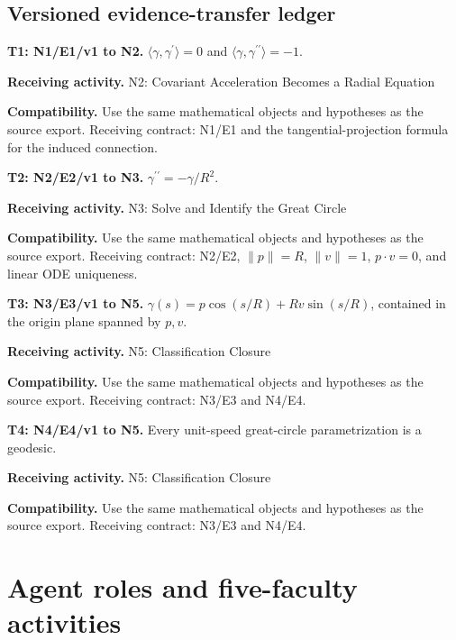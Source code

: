 \documentclass[preprint,12pt,aps,pra,showkeys,amsmath,amssymb,superscriptaddress,floatfix]{revtex4-2}
\theoremstyle{definition}
\theoremstyle{remark}
\newcommand{\field}[2]{\par\smallskip\noindent\textbf{#1.} #2\par}
\begin{document}
\clearpage\subsection{Versioned evidence-transfer ledger}

\begingroup\small\linespread{1.05}\selectfont

\field{T1: N1/E1/v1 to N2}{\(\langle\gamma,\gamma^{\prime}\rangle=0\) and
\(\langle\gamma,\gamma^{\prime\prime}\rangle=-1\).}

\field{Receiving activity}{N2: Covariant Acceleration Becomes a Radial Equation}

\field{Compatibility}{Use the same mathematical objects and hypotheses as the source export.
Receiving contract: N1/E1 and the tangential-projection formula for the
induced connection.}

\field{T2: N2/E2/v1 to N3}{\(\gamma^{\prime\prime}=-\gamma/R^2\).}

\field{Receiving activity}{N3: Solve and Identify the Great Circle}

\field{Compatibility}{Use the same mathematical objects and hypotheses as the source export.
Receiving contract: N2/E2, \(\|p\|=R\), \(\|v\|=1\), \(p\cdot v=0\), and
linear ODE uniqueness.}

\field{T3: N3/E3/v1 to N5}{\(\gamma(s)=p\cos(s/R)+Rv\sin(s/R)\), contained in the origin plane
spanned by \(p,v\).}

\field{Receiving activity}{N5: Classification Closure}

\field{Compatibility}{Use the same mathematical objects and hypotheses as the source export.
Receiving contract: N3/E3 and N4/E4.}

\field{T4: N4/E4/v1 to N5}{Every unit-speed great-circle parametrization is a geodesic.}

\field{Receiving activity}{N5: Classification Closure}

\field{Compatibility}{Use the same mathematical objects and hypotheses as the source export.
Receiving contract: N3/E3 and N4/E4.}

\endgroup

\clearpage\section{Agent roles and five-faculty activities}\begingroup\small\linespread{1.05}\selectfont{}
\end{document}
